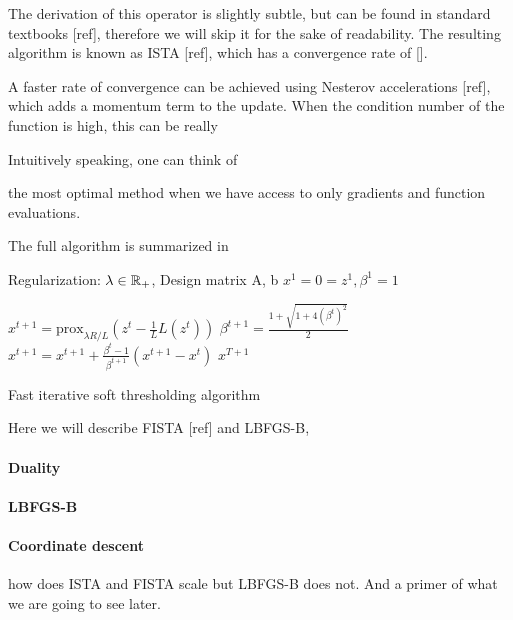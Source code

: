The derivation of this operator is slightly subtle, but can be found in standard textbooks [ref], therefore we will skip it for the sake of readability. The resulting algorithm is known as ISTA [ref], which has a convergence rate of [].

A faster rate of convergence can be achieved using Nesterov accelerations [ref], which adds a momentum term to the update. When the condition number of the function is high, this can be really

 Intuitively speaking, one can think of 

the most optimal method when we have access to only gradients and function evaluations.

The full algorithm is summarized in

    \begin{algorithm}[H]
      \begin{algorithmic}[1] %
      \REQUIRE Regularization: $\lambda \in \mathbb{R}_+$, Design matrix A, b
      \STATE $x^1=0=z^1, \beta^1=1$
          
          \STATE $x^{t+1} = \mathrm{prox}_{\lambda R/L}(z^t - \frac{1}{L}L(z^t))$
          \STATE $\beta^{t+1} = \frac{1 + \sqrt{1 + 4(\beta^t)^2}}{2}$
          \STATE $x^{t + 1} = x^{t + 1} + \frac{\beta^t - 1}{\beta^{t + 1}}(x^{t + 1} - x^t)$
        \ENDFOR
        \RETURN $x^{T + 1}$
        \end{algorithmic}
        \caption{Fast iterative soft thresholding algorithm}
        \label{alg:fista}
    \end{algorithm}

Here we will describe FISTA [ref] and LBFGS-B, 

\paragraph{Duality}

\paragraph{LBFGS-B}

\paragraph{Coordinate descent}

how does ISTA and FISTA scale but LBFGS-B does not. And a primer of what we are going to see later.


